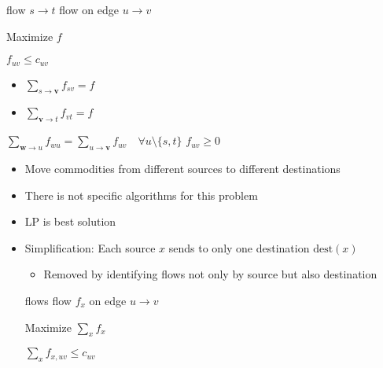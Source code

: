 \begin{itemize}
\begin{itemize}
\begin{itemize}
\begin{itemize}
                        \end{itemize}
                \end{itemize}
        \end{itemize}
        \begin{itemize}
                \begin{itemize}
                     flow $s \to t$
                     flow on edge $u \to v$
                \end{itemize}
             Maximize $f$
                \begin{itemize}
                     $f_{uv} \le c_{uv}$
                        \begin{itemize}
                            \item $\sum_{s \to \textbf{v}} f_{sv} = f$
                            \item $\sum_{\textbf{v} \to t} f_{vt} = f$
                        \end{itemize}
                     $\sum_{\textbf{w} \to u} f_{wu} = \sum_{u \to \textbf{v}} f_{uv} \quad \forall u \setminus \{s, t\}$
                     $f_{uv} \ge 0$
                \end{itemize}
        \end{itemize}
        \begin{itemize}
            \item Move commodities from different sources to different destinations
            \item There is not specific algorithms for this problem
            \item LP is best solution
            \item Simplification: Each source $x$ sends to only one destination $\text{dest}(x)$
                \begin{itemize}
                    \item Removed by identifying flows not only by source but also destination
                \end{itemize}
                \begin{itemize}
                     flows
                     flow $f_x$ on edge $u \to v$
                \end{itemize}
             Maximize $\sum_x f_x$
                \begin{itemize}
                     $\sum_x f_{x,uv} \le c_{uv}$


\end{itemize}
\end{itemize}
\end{itemize}
